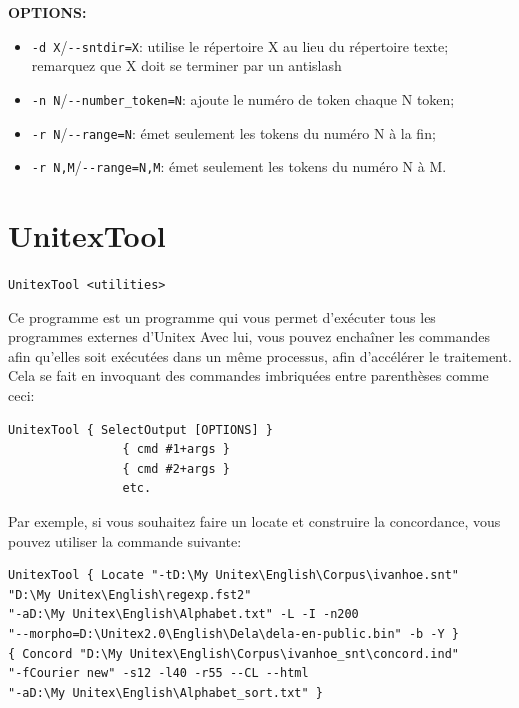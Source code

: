 \bigskip
\noindent \textbf{OPTIONS:}
\begin{itemize}

\item \verb+-d X+/\verb+--sntdir=X+: utilise le répertoire X au lieu du répertoire texte; remarquez que X doit se terminer par un antislash
\item \verb+-n N+/\verb+--number_token=N+: ajoute le numéro de token chaque N token;
\item \verb+-r N+/\verb+--range=N+: émet seulement les tokens du numéro N à la fin;
  \item \verb+-r N,M+/\verb+--range=N,M+: émet seulement les tokens du numéro N à M.
\end{itemize}








\section{UnitexTool}
\label{section-UnitexTool}
\verb+UnitexTool <utilities>+

\bigskip
\noindent Ce programme est un programme qui vous permet d'exécuter tous les programmes externes
d'Unitex
Avec lui, vous pouvez enchaîner les commandes afin qu'elles soit exécutées dans un même processus,
afin d'accélérer le traitement. Cela se fait en invoquant des commandes imbriquées entre parenthèses
comme ceci:

\bigskip
\begin{verbatim}
UnitexTool { SelectOutput [OPTIONS] } 
                { cmd #1+args } 
                { cmd #2+args }
                etc.
\end{verbatim}

\bigskip
\noindent Par exemple, si vous souhaitez faire un locate et construire la  concordance, vous pouvez
utiliser la commande suivante:

\bigskip
\begin{verbatim}
UnitexTool { Locate "-tD:\My Unitex\English\Corpus\ivanhoe.snt" 
"D:\My Unitex\English\regexp.fst2"
"-aD:\My Unitex\English\Alphabet.txt" -L -I -n200 
"--morpho=D:\Unitex2.0\English\Dela\dela-en-public.bin" -b -Y }
{ Concord "D:\My Unitex\English\Corpus\ivanhoe_snt\concord.ind" 
"-fCourier new" -s12 -l40 -r55 --CL --html 
"-aD:\My Unitex\English\Alphabet_sort.txt" }
\end{verbatim}
 
